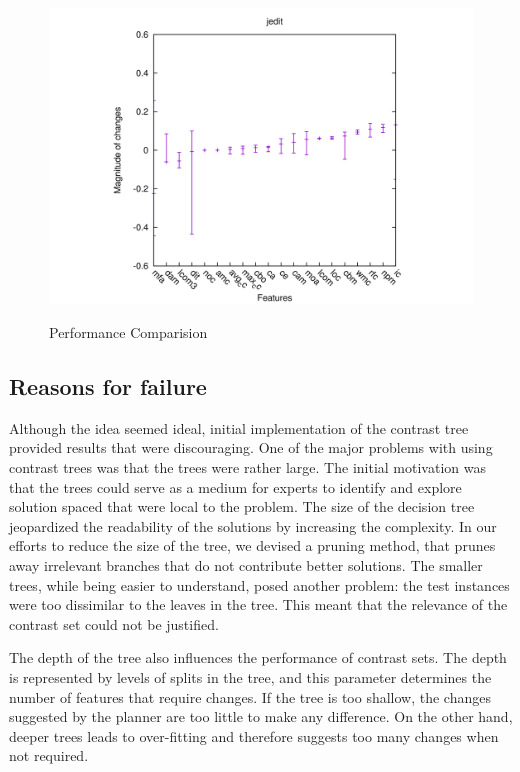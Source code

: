 \documentclass[conference]{IEEEtran}
\begin{document}
\begin{figure}[!t]
\begin{minipage}{0.5\linewidth}
{				\includegraphics[width=\linewidth]{jedit2.png}}
		\end{minipage}
		\caption{Performance Comparision}
	\end{figure}
	
	\subsection{Reasons for failure}
	Although the idea seemed ideal, initial implementation of the contrast tree provided results that were discouraging. One of the major problems with using contrast trees was that the trees were rather large. The initial motivation was that the trees could serve as a medium for experts to identify and explore solution spaced that were local to the problem. The size of the decision tree jeopardized the readability of the solutions by increasing the complexity. In our efforts to reduce the size of the tree, we devised a pruning method, that prunes away irrelevant branches that do not contribute better solutions. The smaller trees, while being easier to understand, posed another problem: the test instances were too dissimilar to the leaves in the tree. This meant that the relevance of the contrast set could not be justified.
	
	The depth of the tree also influences the performance of contrast sets. The depth is represented by levels of splits in the tree, and this parameter determines the number of features that require changes. If the tree is too shallow, the changes suggested by the planner are too little to make any difference. On the other hand, deeper trees leads to over-fitting and therefore suggests too many changes when not required.
	
\end{document}

